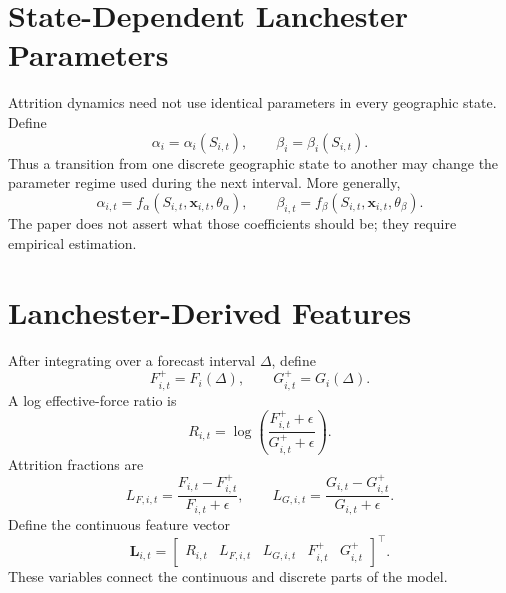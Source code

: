 \documentclass[11pt,letterpaper]{article}
\begin{document}
\section{State-Dependent Lanchester Parameters}
Attrition dynamics need not use identical parameters in every geographic state. Define
\begin{equation}
\alpha_i=\alpha_i(S_{i,t}),
\qquad
\beta_i=\beta_i(S_{i,t}).
\end{equation}
Thus a transition from one discrete geographic state to another may change the parameter regime used during the next interval. More generally,
\begin{equation}
\alpha_{i,t}=f_{\alpha}(S_{i,t},\mathbf{x}_{i,t},\theta_{\alpha}),
\qquad
\beta_{i,t}=f_{\beta}(S_{i,t},\mathbf{x}_{i,t},\theta_{\beta}).
\end{equation}
The paper does not assert what those coefficients should be; they require empirical estimation.

\section{Lanchester-Derived Features}
After integrating over a forecast interval $\Delta$, define
\begin{equation}
F_{i,t}^{+}=F_i(\Delta),
\qquad
G_{i,t}^{+}=G_i(\Delta).
\end{equation}
A log effective-force ratio is
\begin{equation}
R_{i,t}=\log\left(\frac{F_{i,t}^{+}+\epsilon}{G_{i,t}^{+}+\epsilon}\right).
\end{equation}
Attrition fractions are
\begin{equation}
L_{F,i,t}=\frac{F_{i,t}-F_{i,t}^{+}}{F_{i,t}+\epsilon},
\qquad
L_{G,i,t}=\frac{G_{i,t}-G_{i,t}^{+}}{G_{i,t}+\epsilon}.
\end{equation}
Define the continuous feature vector
\begin{equation}
\mathbf{L}_{i,t}=
\begin{bmatrix}
R_{i,t} & L_{F,i,t} & L_{G,i,t} & F_{i,t}^{+} & G_{i,t}^{+}
\end{bmatrix}^{\top}.
\end{equation}
These variables connect the continuous and discrete parts of the model.
\end{document}
